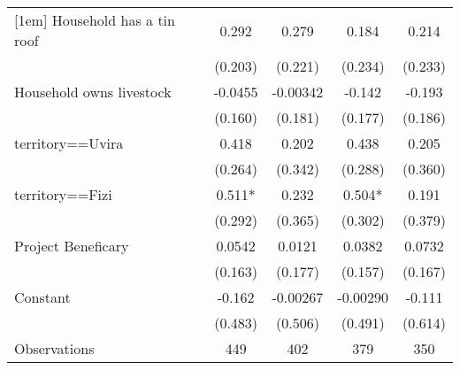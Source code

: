 {\begin{tabular}{l*{4}{c}}
[1em]
Household has a tin roof&       0.292   &       0.279   &       0.184   &       0.214   \\
                    &     (0.203)   &     (0.221)   &     (0.234)   &     (0.233)   \\
[1em]
Household owns livestock&     -0.0455   &    -0.00342   &      -0.142   &      -0.193   \\
                    &     (0.160)   &     (0.181)   &     (0.177)   &     (0.186)   \\
[1em]
territory==Uvira    &       0.418   &       0.202   &       0.438   &       0.205   \\
                    &     (0.264)   &     (0.342)   &     (0.288)   &     (0.360)   \\
[1em]
territory==Fizi     &       0.511*  &       0.232   &       0.504*  &       0.191   \\
                    &     (0.292)   &     (0.365)   &     (0.302)   &     (0.379)   \\
[1em]
Project Beneficary  &      0.0542   &      0.0121   &      0.0382   &      0.0732   \\
                    &     (0.163)   &     (0.177)   &     (0.157)   &     (0.167)   \\
[1em]
Constant            &      -0.162   &    -0.00267   &    -0.00290   &      -0.111   \\
                    &     (0.483)   &     (0.506)   &     (0.491)   &     (0.614)   \\
\hline
Observations        &         449   &         402   &         379   &         350   \\
\hline\hline
\end{tabular}
}
